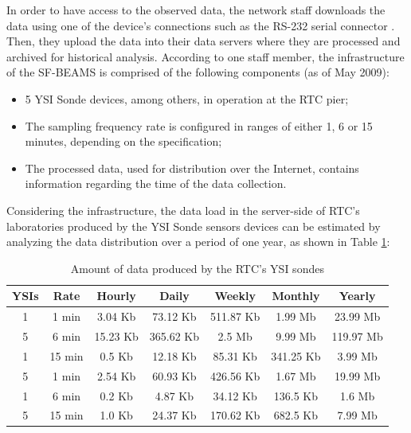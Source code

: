 In order to have access to the observed data, the network staff downloads the
data using one of the device's connections such as the RS-232 serial connector
\cite{rs232}. Then, they upload the data into their data servers where they are
processed and archived for historical analysis. According to one
staff member, the infrastructure of the SF-BEAMS is comprised of the 
following components (as of May 2009):

\begin{itemize}
  \item 5 YSI Sonde devices, among others, in operation at the RTC pier;
  \item The sampling frequency rate is configured in ranges of either 1, 6 or
  15 minutes, depending on the specification;
  \item The processed data, used for distribution over the Internet,
   contains information regarding the time of the data collection.
\end{itemize}

Considering the infrastructure, the data load in the server-side
of RTC's laboratories produced by the YSI Sonde sensors devices can be
estimated by analyzing the data distribution over a period of one year, as
shown in Table \ref{tab:ysi-data-distribution}:

\begin{table}[!b]
    \label{tab:ysi-data-distribution}
     \begin{center}
      \begin{tabular}{|c|c|c|c|c|c|c|}\hline 
        \textbf{YSIs} & \textbf{Rate} & \textbf{Hourly} & \textbf{Daily} &
        \textbf{Weekly} & \textbf{Monthly} & \textbf{Yearly}\\\hline 
        1 & 1 min & 3.04 Kb & 73.12 Kb & 511.87 Kb & 1.99 Mb & 23.99 Mb\\\hline 
        5 & 6 min & 15.23 Kb & 365.62 Kb & 2.5 Mb & 9.99 Mb & 119.97 Mb\\\hline 
        1 & 15 min & 0.5 Kb & 12.18 Kb & 85.31 Kb & 341.25 Kb & 3.99 Mb\\\hline 
        5 & 1 min & 2.54 Kb & 60.93 Kb & 426.56 Kb & 1.67 Mb & 19.99 Mb\\\hline
        1 & 6 min & 0.2 Kb & 4.87 Kb & 34.12 Kb & 136.5 Kb & 1.6 Mb\\\hline 
        5 & 15 min & 1.0 Kb & 24.37 Kb & 170.62 Kb & 682.5 Kb & 7.99 Mb\\\hline
        \end{tabular}
      \end{center}
    \caption{Amount of data produced by the RTC's YSI sondes}
\end{table}

